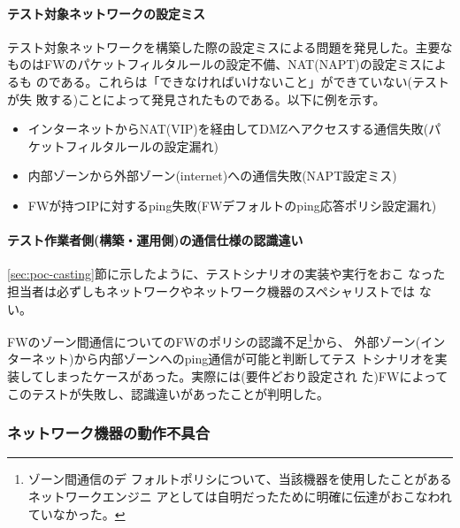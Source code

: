     \paragraph{テスト対象ネットワークの設定ミス}
テスト対象ネットワークを構築した際の設定ミスによる問題を発見した。主要な
ものはFWのパケットフィルタルールの設定不備、NAT(NAPT)の設定ミスによるも
のである。これらは「できなければいけないこと」ができていない(テストが失
敗する)ことによって発見されたものである。以下に例を示す。
\begin{itemize}
 \item インターネットからNAT(VIP)を経由してDMZへアクセスする通信失敗(パ
       ケットフィルタルールの設定漏れ)
 \item \yo 内部ゾーンから外部ゾーン(internet)への通信失敗(NAPT設定ミス)
 \item FWが持つIPに対するping失敗(FWデフォルトのping応答ポリシ設定漏れ)
\end{itemize}

    \paragraph{テスト作業者側(構築・運用側)の通信仕様の認識違い}
\ref{sec:poc-casting}節に示したように、テストシナリオの実装や実行をおこ
なった担当者は必ずしもネットワークやネットワーク機器のスペシャリストでは
ない。

FWのゾーン間通信についてのFWのポリシの認識不足\footnote{ゾーン間通信のデ
フォルトポリシについて、当該機器を使用したことがあるネットワークエンジニ
アとしては自明だったために明確に伝達がおこなわれていなかった。}から、\yo
外部ゾーン(インターネット)から内部ゾーンへのping通信が可能と判断してテス
トシナリオを実装してしまったケースがあった。実際には(要件どおり設定され
た)FWによってこのテストが失敗し、認識違いがあったことが判明した。

   \subsubsection{ネットワーク機器の動作不具合}
   \label{sec:find-nw-device-bug}

